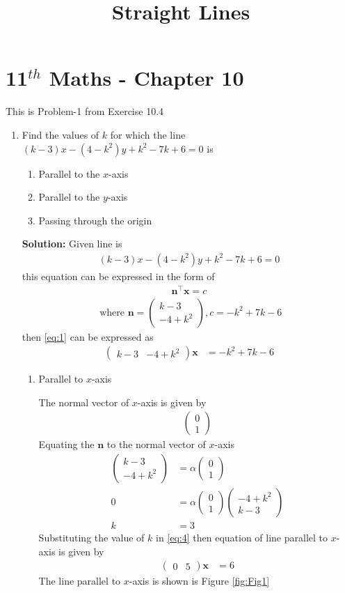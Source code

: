 \documentclass[12pt]{article}
\newcommand{\solution}{\noindent \textbf{Solution: }}
\newcommand{\myvec}[1]{\ensuremath{\begin{pmatrix}#1\end{pmatrix}}}
\let\vec\mathbf
\begin{document}
\begin{center}
\enlargethispage{-4cm}
\title{\textbf{Straight Lines}}
\date{\vspace{-5ex}} %
\maketitle
\end{center}
\setcounter{page}{1}
\section*{11$^{th}$ Maths - Chapter 10}
This is Problem-1 from Exercise 10.4
\begin{enumerate}
\item Find the values of $k$ for which the line $(k-3)x-(4-k^2)y+k^2-7k+6=0$ is
\begin{enumerate}
\item Parallel to the $x$-axis
\item Parallel to the $y$-axis
\item Passing through the origin
\end{enumerate}

\solution
Given line is
\begin{align}
(k-3)x-(4-k^2)y+k^2-7k+6=0 \label{eq:1}
\end{align}
this equation can be expressed in the form of 
\begin{align}
\vec{n}^{\top}\vec{x}=c \label{eq:2}
\end{align}
\begin{align}
\text{ where }
\vec{n} = \myvec{k-3\\-4+k^2} , c  = -k^2+7k-6
\end{align}
then \eqref{eq:1} can be expressed as
\begin{align}
\myvec{k-3 & -4+k^2}\vec{x} &=-k^2+7k-6\label{eq:4}
\end{align}
\begin{enumerate}
    \item Parallel to $x$-axis
    
The normal vector of $x$-axis is given by
\begin{align}
\myvec{0\\1}
\end{align}
Equating the $\vec{n}$ to the normal vector of $x$-axis
\begin{align}
\myvec{k-3\\-4+k^2} &=\alpha\myvec{0\\1}\\
0 &=\alpha\myvec{0\\1}\myvec{-4+k^2\\k-3}\\
k &=3
\end{align}
Substituting the value of $k$ in \eqref{eq:4} then equation of line parallel to $x$-axis is given by
\begin{align}
        \myvec{0 & 5}\vec{x} &=6
\end{align}
The line parallel to $x$-axis is shown is Figure \eqref{fig:Fig1}


\end{enumerate}
\end{enumerate}
\end{document}
